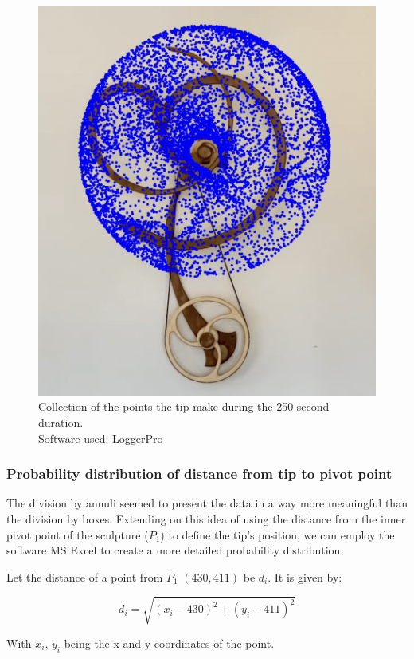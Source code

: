 \documentclass[a4paper,12pt]{article}
\begin{document}
    \begin{figure}[H]
        \begin{center}
            \includegraphics[width=.45\textwidth]{distribution} 
        \end{center}
        \caption{Collection of the points the tip make during the 250-second duration. \\Software used: LoggerPro}
        \label{fig:distribution}
    \end{figure}

    \subsubsection{Probability distribution of distance from tip to pivot point}
    The division by annuli seemed to present the data in a way more meaningful than the division by boxes. Extending on this idea of using the distance from the inner pivot point of the sculpture ($P_1$) to define the tip's position, we can employ the software MS Excel to create a more detailed probability distribution.
    
    Let the distance of a point from $P_1$ $(430, 411)$ be $d_i$. It is given by:

    \begin{equation} \label{eq:14}
        d_i=\sqrt{(x_i-430)^2+(y_i-411)^2}
    \end{equation}

    With $x_i$, $y_i$ being the x and y-coordinates of the point.
\end{document}
